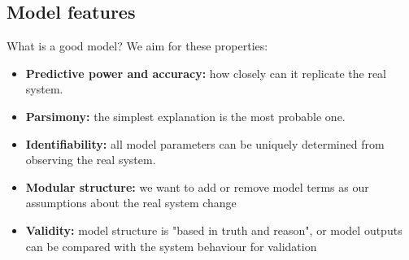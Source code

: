 \documentclass[mathserif,11pt]{beamer}
\begin{document}
\subsection{Model features}
\begin{frame}{What is a good model?}
We aim for these properties:\\
	\begin{itemize}
		\item \textbf{Predictive power and accuracy:} how closely can it replicate the real system.
		\item \textbf{Parsimony:} the simplest explanation is the most probable one.
		\item \textbf{Identifiability:} all model parameters can be uniquely determined from observing the real system.
		\item \textbf{Modular structure:} we want to add or remove model terms as our assumptions about the real system change
		\item \textbf{Validity:} model structure is "based in truth and reason", or model outputs can be compared with the system  behaviour for validation
		\end{itemize}
\end{frame}
\end{document}
